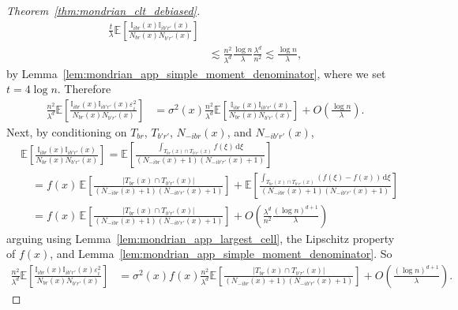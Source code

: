 \documentclass[11pt,lof]{puthesis}
\newcommand{\E}{\ensuremath{\mathbb{E}}}
\newcommand{\I}{\ensuremath{\mathbb{I}}}
\newcommand{\diff}[1]{\,\mathrm{d}#1}
\theoremstyle{break}
\theoremstyle{proof}
\newtheorem{proof}{Proof}
\begin{document}
\begin{proof}[Theorem~\ref{thm:mondrian_clt_debiased}]
\begin{align*}
    \frac{t}{\lambda}
    \E \left[
      \frac{\I_{i b r}(x) \I_{i b' r'}(x)}
      {N_{b r}(x) N_{b' r'}(x)}
    \right] \\
    &\lesssim
    \frac{n^2}{\lambda^d}
    \frac{\log n}{\lambda}
    \frac{\lambda^d}{n^2}
    \lesssim
    \frac{\log n}{\lambda},
  \end{align*}
  by Lemma~\ref{lem:mondrian_app_simple_moment_denominator},
  where we set $t = 4 \log n$.
  Therefore
  \begin{align*}
    \frac{n^2}{\lambda^d}
    \E \left[
      \frac{\I_{i b r}(x) \I_{i b' r'}(x) \varepsilon_i^2}
      {N_{b r}(x) N_{b' r'}(x)}
    \right]
    &=
    \sigma^2(x)
    \frac{n^2}{\lambda^d}
    \E \left[
      \frac{\I_{i b r}(x) \I_{i b' r'}(x)}
      {N_{b r}(x) N_{b' r'}(x)}
    \right]
    + O \left( \frac{\log n}{\lambda} \right).
  \end{align*}
  Next, by conditioning on
  $T_{b r}$, $T_{b' r'}$, $N_{-i b r}(x)$, and $N_{-i b' r'}(x)$,
  \begin{align*}
    &\E \left[
      \frac{\I_{i b r}(x) \I_{i b' r'}(x)}
      {N_{b r}(x) N_{b' r'}(x)}
    \right]
    = \E \left[
      \frac{\int_{T_{b r}(x) \cap T_{b' r'}(x)} f(\xi) \diff \xi}
      {(N_{-i b r}(x)+1) (N_{-i b' r'}(x)+1)}
    \right] \\
    &\quad= f(x) \,
    \E \left[
      \frac{|T_{b r}(x) \cap T_{b' r'}(x)|}
      {(N_{-i b r}(x)+1) (N_{-i b' r'}(x)+1)}
    \right]
    +
    \E \left[
      \frac{\int_{T_{b r}(x) \cap T_{b' r'}(x)}
      (f(\xi) - f(x)) \diff \xi}
      {(N_{-i b r}(x)+1) (N_{-i b' r'}(x)+1)}
    \right] \\
    &\quad=
    f(x) \,
    \E \left[
      \frac{|T_{b r}(x) \cap T_{b' r'}(x)|}
      {(N_{-i b r}(x)+1) (N_{-i b' r'}(x)+1)}
    \right]
    + O \left(
      \frac{\lambda^d}{n^2}
      \frac{(\log n)^{d+1}}{\lambda}
    \right)
  \end{align*}
  arguing using Lemma~\ref{lem:mondrian_app_largest_cell},
  the Lipschitz property of $f(x)$,
  and Lemma~\ref{lem:mondrian_app_simple_moment_denominator}. So
  \begin{align*}
    \frac{n^2}{\lambda^d}
    \E \! \left[
      \frac{\I_{i b r}(x) \I_{i b' r'}(x) \varepsilon_i^2}
      {N_{b r}(x) N_{b' r'}(x)}
    \right]
    &=
    \sigma^2(x)
    f(x)
    \frac{n^2}{\lambda^d}
    \E \! \left[
      \frac{|T_{b r}(x) \cap T_{b' r'}(x)|}
      {(N_{-i b r}(x)+1) (N_{-i b' r'}(x)+1)}
    \right]
    \! + O \! \left(
      \frac{(\log n)^{d+1}}{\lambda}
    \right).

\end{align*}
\end{proof}
\end{document}
